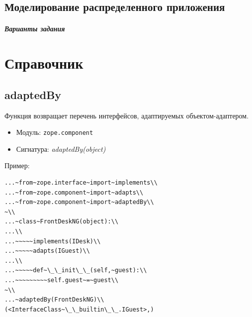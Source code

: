 \documentclass[a4paper,openany,twoside,draft]{book}
\providecommand*{\DUroletitlereference}[1]{\textsl{#1}}
\begin{document}
\section{Моделирование распределенного приложения}
\label{sec:labmodel}
\newpage

\paragraph{Варианты задания}
\newpage


\chapter{Справочник%
  \label{id54}%
}


\section*{adaptedBy%
  \label{adaptedby}%
}

Функция возвращает перечень интерфейсов, адаптируемых
объектом-адаптером.

\begin{itemize}

\item Модуль: \texttt{zope.component}

\item Сигнатура: \DUroletitlereference{adaptedBy(object)}

\end{itemize}

Пример:

\begin{verbatim}
...~from~zope.interface~import~implements\\
...~from~zope.component~import~adapts\\
...~from~zope.component~import~adaptedBy\\
~\\
...~class~FrontDeskNG(object):\\
...\\
...~~~~~implements(IDesk)\\
...~~~~~adapts(IGuest)\\
...\\
...~~~~~def~\_\_init\_\_(self,~guest):\\
...~~~~~~~~~self.guest~=~guest\\
~\\
...~adaptedBy(FrontDeskNG)\\
(<InterfaceClass~\_\_builtin\_\_.IGuest>,)
\end{verbatim}
\end{document}
